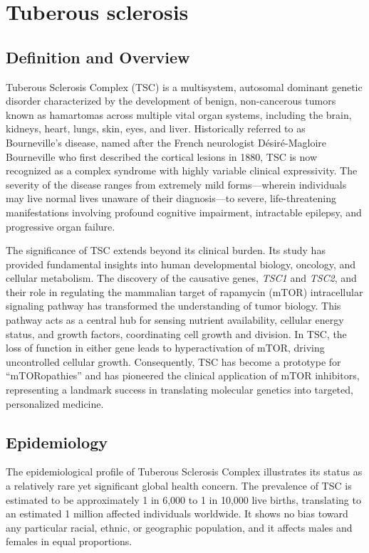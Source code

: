 \chapter{Tuberous sclerosis}

\section*{Definition and Overview}
Tuberous Sclerosis Complex (TSC) is a multisystem, autosomal dominant genetic disorder characterized by the development of benign, non-cancerous tumors known as hamartomas across multiple vital organ systems, including the brain, kidneys, heart, lungs, skin, eyes, and liver. Historically referred to as Bourneville's disease, named after the French neurologist D\'esir\'e-Magloire Bourneville who first described the cortical lesions in 1880, TSC is now recognized as a complex syndrome with highly variable clinical expressivity. The severity of the disease ranges from extremely mild forms---wherein individuals may live normal lives unaware of their diagnosis---to severe, life-threatening manifestations involving profound cognitive impairment, intractable epilepsy, and progressive organ failure.

The significance of TSC extends beyond its clinical burden. Its study has provided fundamental insights into human developmental biology, oncology, and cellular metabolism. The discovery of the causative genes, \textit{TSC1} and \textit{TSC2}, and their role in regulating the mammalian target of rapamycin (mTOR) intracellular signaling pathway has transformed the understanding of tumor biology. This pathway acts as a central hub for sensing nutrient availability, cellular energy status, and growth factors, coordinating cell growth and division. In TSC, the loss of function in either gene leads to hyperactivation of mTOR, driving uncontrolled cellular growth. Consequently, TSC has become a prototype for ``mTORopathies'' and has pioneered the clinical application of mTOR inhibitors, representing a landmark success in translating molecular genetics into targeted, personalized medicine.

\section*{Epidemiology}
The epidemiological profile of Tuberous Sclerosis Complex illustrates its status as a relatively rare yet significant global health concern. The prevalence of TSC is estimated to be approximately 1 in 6,000 to 1 in 10,000 live births, translating to an estimated 1 million affected individuals worldwide. It shows no bias toward any particular racial, ethnic, or geographic population, and it affects males and females in equal proportions.

